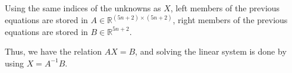 \documentclass{article}
\begin{document}
Using the same indices of the unknowns as $X$, left members of the previous equations are stored in $A \in  \mathbb{R}^{(5n+2) \times (5n+2)}$, right members of the previous equations are stored in $B \in \mathbb{R}^{5n+2}$.

Thus, we have the relation $AX = B$, and solving the linear system is done by using $X = A^{-1} B$.

{}

\end{document}

